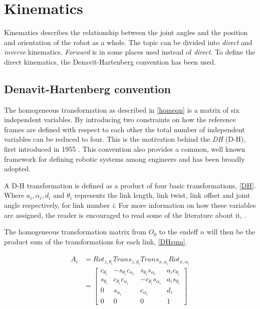 \section{Kinematics}

Kinematics describes the relationship between the joint angles and the position and orientation of the robot as a whole. The topic can be divided into \textit{direct} and \textit{inverse} kinematics. \textit{Forward} is in some places used instead of \textit{direct}. To define the direct kinematics, the Denavit-Hartenberg convention has been used.

\subsection{Denavit-Hartenberg convention}

The homogeneous transformation as described in \eqref{homeqn} is a matrix of six independent variables. By introducing two constraints on how the reference frames are defined with respect to each other the total number of independent variables can be reduced to four. This is the motivation behind the \textit{\gls{DH}} (D-H), first introduced in 1955 \cite{DH}. This convention also provides a common, well known framework for defining robotic systems among engineers and has been broadly adopted.

A D-H transformation is defined as a product of four basic transformations, \eqref{DH}. Where $a_i, \alpha_i, d_i $ and $\theta_i$ represents the link length, link twist, link offset and joint angle respectively, for link number \textit{i}. For more information on how these variables are assigned, the reader is encouraged to read some of the literature about it, \cite{Corke2007}.

The homogeneous transformation matrix from $O_0$ to the \gls{endeff} $n$ will then be the product sum of the transformations for each link, \eqref{DHsum}.

\begin{align}\label{DH}
\begin{split}
A_i &= Rot_{z,\theta_i}Trans_{z,d_i}Trans_{x,a_i}Rot_{x,\alpha_i} \\
&= \begin{bmatrix}
c_{\theta_i} & -s_{\theta_i}c_{\alpha_i} & s_{\theta_i}s_{\alpha_i} & a_{i}c_{\theta_i} \\ 
s_{\theta_i} & c_{\theta_i}c_{\alpha_i} & -c_{\theta_i}s_{\alpha_i} & a_{i}s_{\theta_i} \\ 
0 & s_{\alpha_i} & c_{\alpha_i} & d_i \\ 
0 & 0 & 0 & 1 
\end{bmatrix}
\end{split}
\end{align}

